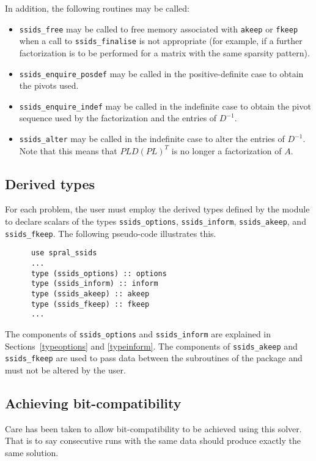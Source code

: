 \documentclass{spral}
\begin{document}
\noindent
In addition, the following routines may be called:
\begin{itemize}
\item {\tt ssids\_free} may be called to free memory associated with {\tt akeep}
or {\tt fkeep} when a call to {\tt ssids\_finalise} is not appropriate (for
example, if a further factorization is to be performed for a matrix with the
same sparsity pattern).
\item {\tt ssids\_enquire\_posdef} may be called
in the  positive-definite case to obtain the pivots used.
\item {\tt ssids\_enquire\_indef} may be called
in the indefinite case to obtain the pivot sequence used by the factorization
and the entries of  ${D}^{-1}$.
\item {\tt ssids\_alter} may be called in the indefinite case to alter
the entries of ${D}^{-1}$.
Note that this means that  $PLD(PL)^T$ is no longer
a factorization of $A$.

\end{itemize}


\subsection{Derived types} \label{derived types}

For each problem, the user must employ the derived types defined by the
module to declare scalars of the types
{\tt ssids\_options}, {\tt ssids\_inform}, {\tt ssids\_akeep}, and {\tt ssids\_fkeep}.
The following pseudo-code illustrates this.
\begin{verbatim}
      use spral_ssids
      ...
      type (ssids_options) :: options
      type (ssids_inform) :: inform
      type (ssids_akeep) :: akeep
      type (ssids_fkeep) :: fkeep
      ...
\end{verbatim}
The components of {\tt ssids\_options} and {\tt ssids\_inform} are explained
in Sections~\ref{typeoptions} and \ref{typeinform}.
The components of {\tt ssids\_akeep} and {\tt ssids\_fkeep} are used to pass
data between the subroutines of the package and must not be altered by the user.

\subsection{Achieving bit-compatibility} \label{bitcompat}
Care has been taken to allow bit-compatibility to be achieved using this solver.
That is to say consecutive runs with the same data should produce exactly
the same solution.
\end{document}
